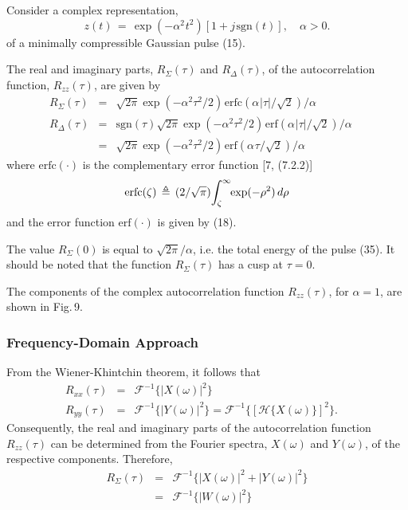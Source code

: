 \documentclass[journal]{IEEEtran}
\begin{document}
\vspace{0.1cm}
 Consider a complex representation,
\begin{equation}
	z(t)  \,=\, \exp(-\alpha^2\mspace{1mu} t^2)[1+ j\mspace{2mu}\mathrm{sgn}(t)],
	\quad \alpha > 0.
\end{equation}
of a minimally compressible Gaussian pulse (15).

The real and imaginary parts, $R_\Sigma(\tau)$ and $R_\Delta(\tau)$, of the autocorrelation function, $R_{zz}(\tau)$, are given by
\begin{eqnarray}
	R_\Sigma(\tau) \!\!&\!\!=\!\!&\!  \sqrt{2 \pi} \exp(-\alpha^2 \tau^2/2) 
	\mspace{2mu} \mathrm{erfc}(\alpha\mspace{1mu} |\tau|/\sqrt{2})/\alpha    \\
	R_\Delta(\tau) \!\!&\!\!=\!\!&
		\! \mathrm{sgn}(\tau)\sqrt{2 \pi} \exp(-\alpha^2 \tau^2/2) 
	\mspace{2mu} \mathrm{erf}(\alpha\mspace{1mu} |\tau|/\sqrt{2})/\alpha 
	\quad \, \nonumber   \\
	&\!\!=\!\!&	\! \sqrt{2 \pi} \exp(-\alpha^2 \tau^2/2) 
	\mspace{2mu} \mathrm{erf}(\alpha\mspace{1mu} \tau/\sqrt{2})/\alpha \nonumber 
\end{eqnarray}
where $\mathrm{erfc}(\cdot)$ is the complementary error function [7, (7.2.2)]
\begin{equation}
	\mathrm{erfc}(\zeta)  \,\triangleq\,
	(2/\sqrt{\pi})\mspace{-3mu} \int_\zeta^\infty \mspace{-5mu}
	\exp(-\rho^2) \,d\rho
\end{equation}
and the error function $\mathrm{erf}(\cdot)$ is given by (18). 

The value $R_\Sigma(0)$ is equal to $\sqrt{2 \pi}/\alpha$, i.e. the total energy of the pulse (35). It should be noted that the function $R_\Sigma(\tau)$ has a cusp at $\tau=0$.

The components of the complex autocorrelation function $R_{zz}(\tau)$, for $\alpha=1$, are shown in Fig.\,9. 

\vspace{0.15cm}
\subsubsection{Frequency-Domain Approach}
From the Wiener-Khintchin theorem, it follows that
\begin{eqnarray}
	R_{xx}(\tau)\!\! &\!\!=\!\!& \! \mathcal{F}^{-1}\{|X(\omega)|^2\} 
	\nonumber \\
	R_{yy}(\tau)\!\! &\!\!=\!\!& \! \mathcal{F}^{-1}\{|Y(\omega)|^2\}
	= \mathcal{F}^{-1}\{[\mathcal{H}\{X(\omega)\}]^2\} .\quad
	\end{eqnarray}
Consequently, the real and imaginary parts of the autocorrelation function $R_{zz}(\tau)$ can be determined from the Fourier spectra, $X(\omega)$ and $Y(\omega)$, of the respective components. Therefore,
\begin{eqnarray}
	R_\Sigma(\tau) \! &\!\!=\!\!& \!
	\mathcal{F}^{-1}\{|X(\omega)|^2+|Y(\omega)|^2\} \nonumber \\
	\! &\!\!=\!\!& \!
	\mathcal{F}^{-1}\{|W(\omega)|^2\} 
\end{eqnarray}
${}$
\vspace{-0.7cm}
\end{document}
